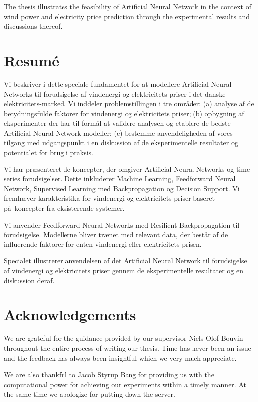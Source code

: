\documentclass[twoside,11pt,openright]{report}
\begin{document}
The thesis illustrates the feasibility of Artificial Neural Network in the context of wind power and electricity price prediction through the experimental results and discussions thereof.

\chapter*{Resum\'e}

Vi beskriver i dette speciale fundamentet for at modellere Artificial Neural Networks til forudsigelse af vindenergi og elektricitets priser i det danske elektricitets-marked. Vi inddeler problemstillingen i tre omr\aa der: (a) analyse af de betydningsfulde faktorer for vindenergi og elektricitets priser; (b) opbygning af eksperimenter der har til form\aa l at validere analysen og etablere de bedste Artificial Neural Network modeller; (c) bestemme anvendeligheden af vores tilgang med udgangspunkt i en diskussion af de eksperimentelle resultater og potentialet for brug i praksis.

Vi har pr\ae senteret de koncepter, der omgiver Artificial Neural Networks og time series forudsigelser. Dette inkluderer Machine Learning, Feedforward Neural Network, Supervised Learning med Backpropagation og Decision Support. Vi fremh\ae ver karakteristika for vindenergi og elektricitets priser baseret p\aa ~koncepter fra eksisterende systemer.

Vi anvender Feedforward Neural Networks med Resilient Backpropagation til forudsigelse. Modellerne bliver tr\ae net med relevant data, der best\aa r af de influerende faktorer for enten vindenergi eller elektricitets prisen.

Specialet illustrerer anvendelsen af det Artificial Neural Network til forudsigelse af vindenergi og elektricitets priser gennem de eksperimentelle resultater og en diskussion deraf. 

\chapter*{Acknowledgements}

We are grateful for the guidance provided by our supervisor Niels Olof Bouvin throughout the entire process of writing our thesis. Time has never been an issue and the feedback has always been insightful which we very much appreciate.

We are also thankful to Jacob Styrup Bang for providing us with the computational power for achieving our experiments within a timely manner. At the same time we apologize for putting down the server.
\end{document}
